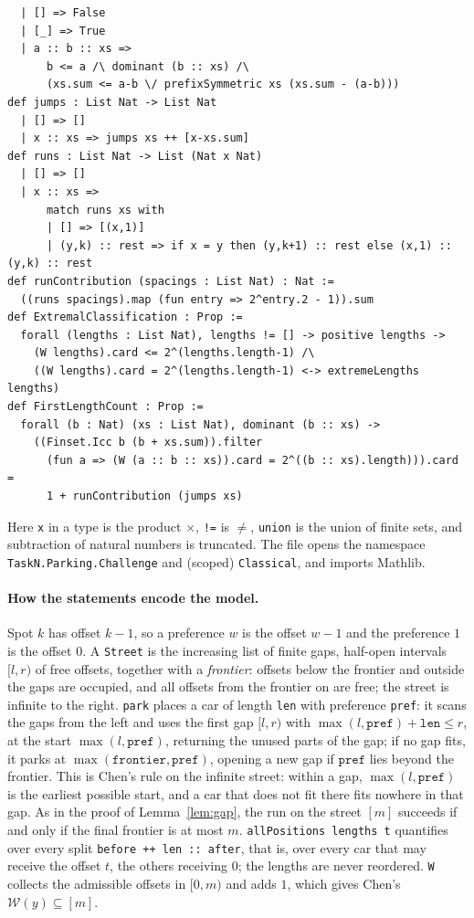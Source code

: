 \documentclass[11pt]{article}
\theoremstyle{remark}
\newcommand{\W}{\mathcal W}
\begin{document}
{{\begin{verbatim}
  | [] => False
  | [_] => True
  | a :: b :: xs =>
      b <= a /\ dominant (b :: xs) /\
      (xs.sum <= a-b \/ prefixSymmetric xs (xs.sum - (a-b)))
def jumps : List Nat -> List Nat
  | [] => []
  | x :: xs => jumps xs ++ [x-xs.sum]
def runs : List Nat -> List (Nat x Nat)
  | [] => []
  | x :: xs =>
      match runs xs with
      | [] => [(x,1)]
      | (y,k) :: rest => if x = y then (y,k+1) :: rest else (x,1) :: (y,k) :: rest
def runContribution (spacings : List Nat) : Nat :=
  ((runs spacings).map (fun entry => 2^entry.2 - 1)).sum
def ExtremalClassification : Prop :=
  forall (lengths : List Nat), lengths != [] -> positive lengths ->
    (W lengths).card <= 2^(lengths.length-1) /\
    ((W lengths).card = 2^(lengths.length-1) <-> extremeLengths lengths)
def FirstLengthCount : Prop :=
  forall (b : Nat) (xs : List Nat), dominant (b :: xs) ->
    ((Finset.Icc b (b + xs.sum)).filter
      (fun a => (W (a :: b :: xs)).card = 2^((b :: xs).length))).card =
      1 + runContribution (jumps xs)
\end{verbatim}}
\noindent Here \texttt{x} in a type is the product $\times$, \texttt{!=} is
$\ne$, \texttt{union} is the union of finite sets, and subtraction of natural
numbers is truncated. The file opens the namespace
\texttt{TaskN.Parking.Challenge} and (scoped) \texttt{Classical}, and imports Mathlib.

\paragraph{How the statements encode the model.} Spot $k$ has offset $k-1$,
so a preference $w$ is the offset $w-1$ and the preference $1$ is the offset
$0$. A \texttt{Street} is the increasing list of finite gaps, half-open
intervals $[l,r)$ of free offsets, together with a \emph{frontier}: offsets
below the frontier and outside the gaps are occupied, and all offsets from the
frontier on are free; the street is infinite to the right. \texttt{park} places a car of
length \texttt{len} with preference \texttt{pref}: it scans the gaps from the
left and uses the first gap $[l,r)$ with $\max(l,\mathtt{pref})+\mathtt{len}\le
r$, at the start $\max(l,\mathtt{pref})$, returning the unused parts of the gap;
if no gap fits, it parks at $\max(\mathtt{frontier},\mathtt{pref})$, opening a new
gap if $\mathtt{pref}$ lies beyond the frontier. This is Chen's rule on the
infinite street: within a gap, $\max(l,\mathtt{pref})$ is the earliest possible
start, and a car that does not fit there fits nowhere in that gap. As in the
proof of Lemma~\ref{lem:gap}, the run on the street $[m]$ succeeds if and only
if the final frontier is at most $m$. \texttt{allPositions
lengths t} quantifies over every split \texttt{before ++ len :: after}, that
is, over every car that may receive the offset $t$, the others receiving $0$;
the lengths are never reordered. \texttt{W} collects the admissible offsets in
$[0,m)$ and adds $1$, which gives Chen's $\W(y)\subseteq[m]$.

}
\end{document}
